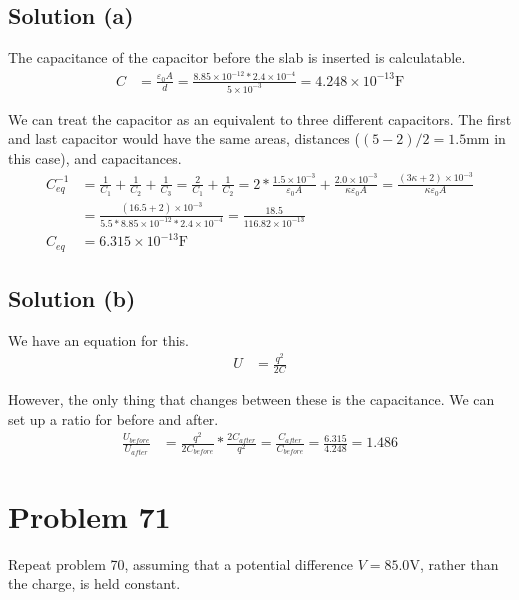 \documentclass[12pt]{article}
\begin{document}
\subsection*{Solution (a)}
The capacitance of the capacitor before the slab is inserted is calculatable.
\begin{align*}
    C   &=  \frac{\varepsilon_0 A}{d}
        =   \frac{8.85 \times 10^{-12} * 2.4 \times 10^{-4}}{5 \times 10^{-3}}
        =   4.248 \times 10^{-13} \unit{\farad}
\end{align*}

We can treat the capacitor as an equivalent to three different capacitors. 
The first and last capacitor would have the same areas, distances ($(5 - 2) / 2 = 1.5 \unit{\milli\meter}$ in this case), and capacitances.
\begin{align*}
    C_{eq}^{-1} &=  \frac{1}{C_1} + \frac{1}{C_2} + \frac{1}{C_3}
        =   \frac{2}{C_1} + \frac{1}{C_2}
        =   2*\frac{1.5 \times 10^{-3}}{\varepsilon_0 A} + \frac{2.0 \times 10^{-3}}{\kappa \varepsilon_0 A}
        =   \frac{(3\kappa + 2) \times 10^{-3}}{\kappa \varepsilon_0 A}\\
        &=  \frac{(16.5 + 2) \times 10^{-3}}{5.5 * 8.85 \times 10^{-12} * 2.4 \times 10^{-4}}
        =   \frac{18.5}{116.82 \times 10^{-13}}\\
    C_{eq}  &=  \boxed{6.315 \times 10^{-13} \unit{\farad}}
\end{align*}

\subsection*{Solution (b)}
We have an equation for this.
\begin{align*}
    U   &=  \frac{q^2}{2C}
\end{align*}

However, the only thing that changes between these is the capacitance.
We can set up a ratio for before and after.
\begin{align*}
    \frac{U_{before}}{U_{after}}    &=  \frac{q^2}{2C_{before}} * \frac{2C_{after}}{q^2}
        =   \frac{C_{after}}{C_{before}}
        =   \frac{6.315}{4.248}
        =   \boxed{1.486}
\end{align*}

\section*{Problem 71}
Repeat problem 70, assuming that a potential difference $V = 85.0 \unit{\volt}$, rather than the charge, is held constant.
\end{document}
